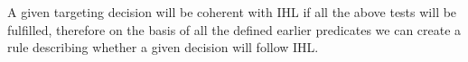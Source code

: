 A given targeting decision will be coherent with IHL if all the above tests will be fulfilled, therefore on the basis of all the defined earlier predicates we can create a rule describing whether a given decision will follow IHL.

